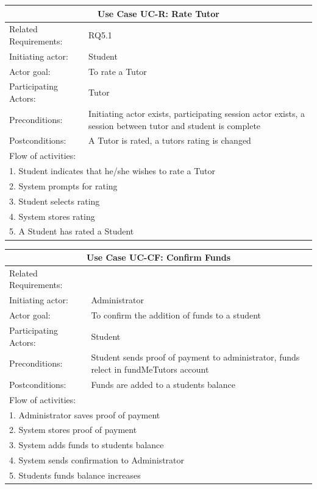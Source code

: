 \documentclass[12pt]{article}
\begin{document}
{    \begin{tabular}{| l | p{10cm}| }
      \hline\multicolumn{2}{|c|}{ \textbf{Use Case UC-R: Rate Tutor} }\\ \hline
      Related Requirements: &  RQ5.1\\ \hline
      Initiating actor: & Student \\ \hline
      Actor goal: & To rate a Tutor\\ \hline
      Participating Actors: &Tutor\\ \hline
      Preconditions: &Initiating actor exists, participating session actor exists, a session between  tutor and student is complete\\ \hline
      Postconditions: & A Tutor is rated, a tutors rating is changed\\ \hline
      \multicolumn{2}{|l|}{Flow of activities:}\\ \hline
      \multicolumn{2}{|p{15cm}|}{1. Student indicates that he/she wishes to rate a Tutor}\\
      \multicolumn{2}{|p{15cm}|}{2. System prompts for rating}\\
      \multicolumn{2}{|l|}{3. Student selects rating}\\
      \multicolumn{2}{|l|}{4. System stores rating}\\
      \multicolumn{2}{|l|}{5. A Student has rated a Student}\\
       \hline
    \end{tabular}

		\begin{tabular}{| l | p{10cm}| }
      \hline\multicolumn{2}{|c|}{ \textbf{Use Case UC-CF: Confirm Funds} }\\ \hline
      Related Requirements: &\\ \hline
      Initiating actor: & Administrator\\ \hline
      Actor goal: &To confirm the addition of funds to a student\\ \hline
      Participating Actors: &Student\\ \hline
      Preconditions: &Student sends proof of payment to administrator, funds relect in fundMeTutors account\\ \hline
      Postconditions: &Funds are added to a students balance\\ \hline
      \multicolumn{2}{|l|}{Flow of activities:}\\ \hline
      \multicolumn{2}{|p{15cm}|}{1. Administrator saves proof of payment}\\
      \multicolumn{2}{|p{15cm}|}{2. System stores proof of payment}\\
      \multicolumn{2}{|l|}{3. System adds funds to students balance}\\
      \multicolumn{2}{|l|}{4. System sends confirmation to Administrator}\\
      \multicolumn{2}{|l|}{5. Students funds balance increases}\\
       \hline
    \end{tabular}

}
\end{document}
